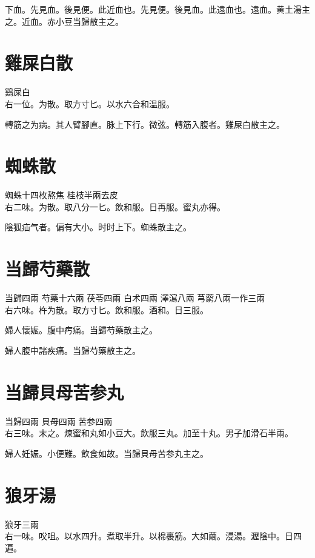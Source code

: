下血。先見血。後見便。此近血也。先見便。後見血。此遠血也。遠血。黄土湯主之。近血。赤小豆当歸散主之。

\section{雞屎白散}

鷄屎白\\
右一位。为散。取方寸匕。以水六合和温服。

轉筋之为病。其人臂腳直。脉上下行。微弦。轉筋入腹者。雞屎白散主之。

\section{蜘蛛散}

蜘蛛{\scriptsize 十四枚熬焦} 桂枝{\scriptsize 半兩去皮}\\
右二味。为散。取八分一匕。飲和服。日再服。蜜丸亦得。

陰狐疝气者。偏有大小。时时上下。蜘蛛散主之。

\section{当歸芍藥散}

当歸{\scriptsize 四兩} 芍藥{\scriptsize 十六兩} 茯苓{\scriptsize 四兩} 白术{\scriptsize 四兩} 澤瀉{\scriptsize 八兩} 芎藭{\scriptsize 八兩一作三兩}\\
右六味。杵为散。取方寸匕。飲和服。酒和。日三服。

婦人懷娠。腹中㽲痛。当歸芍藥散主之。

婦人腹中諸疾痛。当歸芍藥散主之。

\section{当歸貝母苦参丸}

当歸{\scriptsize 四兩} 貝母{\scriptsize 四兩} 苦参{\scriptsize 四兩}\\
右三味。末之。煉蜜和丸如小豆大。飲服三丸。加至十丸。男子加滑石半兩。

婦人妊娠。小便難。飲食如故。当歸貝母苦参丸主之。

\section{狼牙湯}

狼牙{\scriptsize 三兩}\\
右一味。㕮咀。以水四升。煮取半升。以棉裹筋。大如繭。浸湯。瀝陰中。日四遍。

